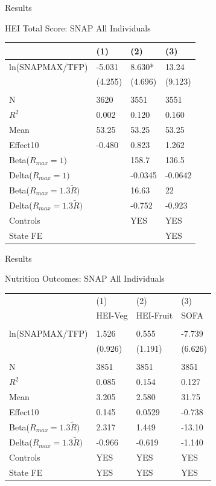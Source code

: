 \documentclass{beamer}
\begin{document}
\begin{frame}{Results}
\begin{table}{HEI Total Score: SNAP All Individuals}

\begin{tabular}{llll}
\toprule
 & (1) & (2) & (3) \\
 \midrule
ln(SNAPMAX/TFP) & -5.031 & 8.630* & 13.24 \\
 & (4.255) & (4.696) & (9.123) \\
 \\
N & 3620 & 3551 & 3551 \\
$R^2$ & 0.002 & 0.120 & 0.160 \\
Mean & 53.25 & 53.25 & 53.25 \\
Effect10 & -0.480 & 0.823 & 1.262 \\
Beta($R_{max}=1)$&  & 158.7 & 136.5 \\
Delta($R_{max}=1)$&  & -0.0345 & -0.0642 \\
Beta($R_{max}=1.3\tilde{R})$ &  & 16.63 & 22 \\
Delta($R_{max}=1.3\tilde{R})$&  & -0.752 & -0.923 \\
Controls & & YES & YES \\
State FE &  &  & YES \\
\bottomrule

\end{tabular}
\end{table}
\end{frame}

\begin{frame}{Results}
\begin{table}{Nutrition Outcomes: SNAP All Individuals}
\begin{tabular}{llll}
\toprule
 & (1) & (2) & (3)   \\

 & HEI-Veg & HEI-Fruit & SOFA   \\
 \midrule
 \\
ln(SNAPMAX/TFP) & 1.526 & 0.555 & -7.739   \\
 & (0.926) & (1.191) & (6.626)  \\
 \\
N & 3851 & 3851 & 3851   \\
$R^2$ & 0.085 & 0.154 & 0.127   \\
Mean & 3.205 & 2.580 & 31.75   \\
Effect10 & 0.145 & 0.0529 & -0.738   \\
Beta($R_{max}=1.3\tilde{R})$ & 2.317 & 1.449 & -13.10   \\
Delta($R_{max}=1.3\tilde{R})$ & -0.966 & -0.619 & -1.140   \\
Controls & YES & YES & YES   \\
State FE & YES & YES & YES   \\
\bottomrule
\end{tabular}
\end{table}
\end{frame}
\end{document}
